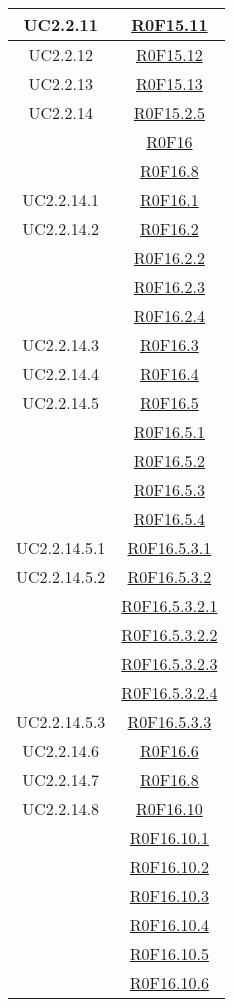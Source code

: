 \documentclass[../AnalisiDeiRequisiti.tex]{subfiles}
\begin{document}
\begin{longtable}{|c|c|}
	UC2.2.11 & \hyperlink{R0F15.11}{R0F15.11}\\\hline
	UC2.2.12 & \hyperlink{R0F15.12}{R0F15.12}\\\hline
	UC2.2.13 & \hyperlink{R0F15.13}{R0F15.13}\\\hline
	UC2.2.14 & \hyperlink{R0F15.2.5}{R0F15.2.5}\\& \hyperlink{R0F16}{R0F16}\\& \hyperlink{R0F16.8}{R0F16.8}\\\hline
	UC2.2.14.1 & \hyperlink{R0F16.1}{R0F16.1}\\\hline
	UC2.2.14.2 & \hyperlink{R0F16.2}{R0F16.2}\\& \hyperlink{R0F16.2.2}{R0F16.2.2}\\& \hyperlink{R0F16.2.3}{R0F16.2.3}\\& \hyperlink{R0F16.2.4}{R0F16.2.4}\\\hline
	UC2.2.14.3 & \hyperlink{R0F16.3}{R0F16.3}\\\hline
	UC2.2.14.4 & \hyperlink{R0F16.4}{R0F16.4}\\\hline
	UC2.2.14.5 & \hyperlink{R0F16.5}{R0F16.5}\\& \hyperlink{R0F16.5.1}{R0F16.5.1}\\& \hyperlink{R0F16.5.2}{R0F16.5.2}\\& \hyperlink{R0F16.5.3}{R0F16.5.3}\\& \hyperlink{R0F16.5.4}{R0F16.5.4}\\\hline
	UC2.2.14.5.1 & \hyperlink{R0F16.5.3.1}{R0F16.5.3.1}\\\hline
	UC2.2.14.5.2 & \hyperlink{R0F16.5.3.2}{R0F16.5.3.2}\\& \hyperlink{R0F16.5.3.2.1}{R0F16.5.3.2.1}\\& \hyperlink{R0F16.5.3.2.2}{R0F16.5.3.2.2}\\& \hyperlink{R0F16.5.3.2.3}{R0F16.5.3.2.3}\\& \hyperlink{R0F16.5.3.2.4}{R0F16.5.3.2.4}\\\hline
	UC2.2.14.5.3 & \hyperlink{R0F16.5.3.3}{R0F16.5.3.3}\\\hline
	UC2.2.14.6 & \hyperlink{R0F16.6}{R0F16.6}\\\hline
	UC2.2.14.7 & \hyperlink{R0F16.8}{R0F16.8}\\\hline
	UC2.2.14.8 & \hyperlink{R0F16.10}{R0F16.10}\\& \hyperlink{R0F16.10.1}{R0F16.10.1}\\& \hyperlink{R0F16.10.2}{R0F16.10.2}\\& \hyperlink{R0F16.10.3}{R0F16.10.3}\\& \hyperlink{R0F16.10.4}{R0F16.10.4}\\& \hyperlink{R0F16.10.5}{R0F16.10.5}\\& \hyperlink{R0F16.10.6}{R0F16.10.6}\\\hline

\end{longtable}
\end{document}
